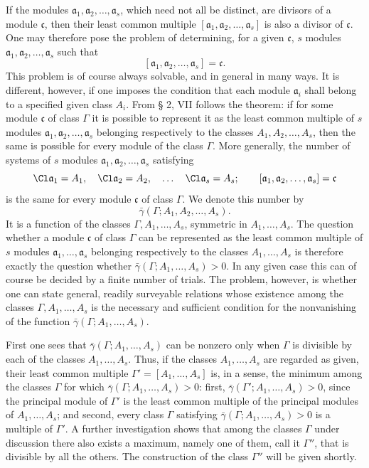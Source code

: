 If the modules $\mathfrak a_1,\mathfrak a_2,\ldots,\mathfrak a_s$, which need not all be distinct, are divisors of a module $\mathfrak c$, then their least common multiple $[\mathfrak a_1,\mathfrak a_2,\ldots,\mathfrak a_s]$ is also a divisor of $\mathfrak c$. One may therefore pose the problem of determining, for a given $\mathfrak c$, $s$ modules $\mathfrak a_1,\mathfrak a_2,\ldots,\mathfrak a_s$ such that
\[
 [\mathfrak a_1,\mathfrak a_2,\ldots,\mathfrak a_s]=\mathfrak c.
\]
This problem is of course always solvable, and in general in many ways. It is different, however, if one imposes the condition that each module $\mathfrak a_i$ shall belong to a specified given class $A_i$. From § 2, VII follows the theorem: if for some module $\mathfrak c$ of class $\Gamma$ it is possible to represent it as the least common multiple of $s$ modules $\mathfrak a_1,\mathfrak a_2,\ldots,\mathfrak a_s$ belonging respectively to the classes $A_1,A_2,\ldots,A_s$, then the same is possible for every module of the class $\Gamma$. More generally, the number of systems of $s$ modules $\mathfrak a_1,\mathfrak a_2,\ldots,\mathfrak a_s$ satisfying
\[
 \Cl\mathfrak a_1=A_1,
 \quad
 \Cl\mathfrak a_2=A_2,
 \quad\ldots\quad
 \Cl\mathfrak a_s=A_s;
 \qquad
 [\mathfrak a_1,\mathfrak a_2,\ldots,\mathfrak a_s]=\mathfrak c
\]
is the same for every module $\mathfrak c$ of class $\Gamma$. We denote this number by
\[
 \bar\gamma(\Gamma;A_1,A_2,\ldots,A_s).
\]
It is a function of the classes $\Gamma,A_1,\ldots,A_s$, symmetric in $A_1,\ldots,A_s$. The question whether a module $\mathfrak c$ of class $\Gamma$ can be represented as the least common multiple of $s$ modules $\mathfrak a_1,\ldots,\mathfrak a_s$ belonging respectively to the classes $A_1,\ldots,A_s$ is therefore exactly the question whether $\bar\gamma(\Gamma;A_1,\ldots,A_s)>0$. In any given case this can of course be decided by a finite number of trials. The problem, however, is whether one can state general, readily surveyable relations whose existence among the classes $\Gamma,A_1,\ldots,A_s$ is the necessary and sufficient condition for the nonvanishing of the function $\bar\gamma(\Gamma;A_1,\ldots,A_s)$.

First one sees that $\bar\gamma(\Gamma;A_1,\ldots,A_s)$ can be nonzero only when $\Gamma$ is divisible by each of the classes $A_1,\ldots,A_s$. Thus, if the classes $A_1,\ldots,A_s$ are regarded as given, their least common multiple $\Gamma'=[A_1,\ldots,A_s]$ is, in a sense, the minimum among the classes $\Gamma$ for which $\bar\gamma(\Gamma;A_1,\ldots,A_s)>0$: first, $\bar\gamma(\Gamma';A_1,\ldots,A_s)>0$, since the principal module of $\Gamma'$ is the least common multiple of the principal modules of $A_1,\ldots,A_s$; and second, every class $\Gamma$ satisfying $\bar\gamma(\Gamma;A_1,\ldots,A_s)>0$ is a multiple of $\Gamma'$. A further investigation shows that among the classes $\Gamma$ under discussion there also exists a maximum, namely one of them, call it $\Gamma''$, that is divisible by all the others. The construction of the class $\Gamma''$ will be given shortly.

